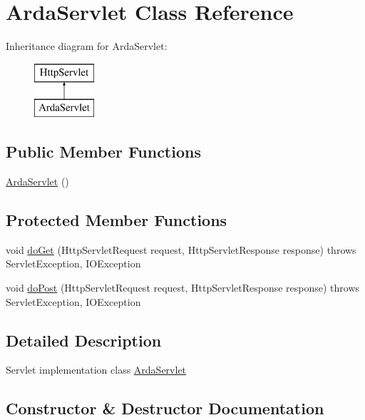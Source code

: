 \hypertarget{class_arda_servlet}{}\section{Arda\+Servlet Class Reference}
\label{class_arda_servlet}
Inheritance diagram for Arda\+Servlet\+:\begin{figure}[H]
\begin{center}
\leavevmode
\includegraphics[height=2.000000cm]{class_arda_servlet}
\end{center}
\end{figure}
\subsection*{Public Member Functions}
\begin{DoxyCompactItemize}
\item 
\hyperlink{class_arda_servlet_a2c6a6ef64e38c420227933a842db3363}{Arda\+Servlet} ()
\end{DoxyCompactItemize}
\subsection*{Protected Member Functions}
\begin{DoxyCompactItemize}
\item 
void \hyperlink{class_arda_servlet_a243cd4607430d73826f59a340b04a7a5}{do\+Get} (Http\+Servlet\+Request request, Http\+Servlet\+Response response)  throws Servlet\+Exception, I\+O\+Exception 
\item 
void \hyperlink{class_arda_servlet_a327279374b3d8a0a283b8e3b7c1ce739}{do\+Post} (Http\+Servlet\+Request request, Http\+Servlet\+Response response)  throws Servlet\+Exception, I\+O\+Exception 
\end{DoxyCompactItemize}


\subsection{Detailed Description}
Servlet implementation class \hyperlink{class_arda_servlet}{Arda\+Servlet} 

\subsection{Constructor \& Destructor Documentation}
\hypertarget{class_arda_servlet_a2c6a6ef64e38c420227933a842db3363}{}
